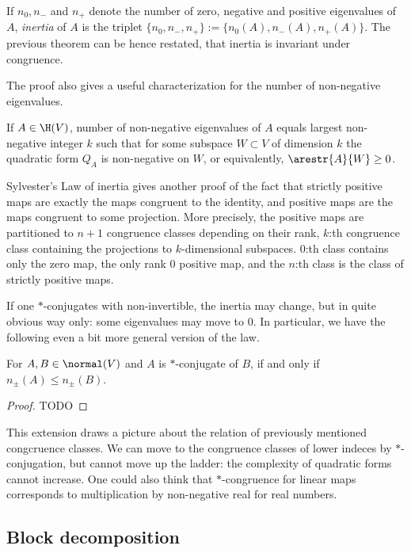 If $n_{0}, n_{-}$ and $n_{+}$ denote the number of zero, negative and positive eigenvalues of $A$, \textit{inertia} of $A$ is the triplet $\{n_{0}, n_{-}, n_{+} \} := \{n_{0}(A), n_{-}(A), n_{+}(A) \}$. The previous theorem can be hence restated, that inertia is invariant under congruence.

The proof also gives a useful characterization for the number of non-negative eigenvalues.

\begin{kor}\label{subspace_lemma}
	If $A \in \H(V)$, number of non-negative eigenvalues of $A$ equals largest non-negative integer $k$ such that for some subspace $W \subset V$ of dimension $k$ the quadratic form $Q_{A}$ is non-negative on $W$, or equivalently, $\arestr{A}{W} \geq 0$.
\end{kor}

Sylvester's Law of inertia gives another proof of the fact that strictly positive maps are exactly the maps congruent to the identity, and positive maps are the maps congruent to some projection. More precisely, the positive maps are partitioned to $n + 1$ congruence classes depending on their rank, $k$:th congruence class containing the projections to $k$-dimensional subspaces. $0$:th class contains only the zero map, the only rank $0$ positive map, and the $n$:th class is the class of strictly positive maps.

If one $*$-conjugates with non-invertible, the inertia may change, but in quite obvious way only: some eigenvalues may move to $0$. In particular, we have the following even a bit more general version of the law.

\begin{lause}
	For $A, B \in \normal(V)$ and $A$ is $*$-conjugate of $B$, if and only if $n_{\pm}(A) \leq n_{\pm}(B)$.
\end{lause}
\begin{proof}
	TODO
\end{proof}

This extension draws a picture about the relation of previously mentioned congcruence classes. We can move to the congruence classes of lower indeces by $*$-conjugation, but cannot move up the ladder: the complexity of quadratic forms cannot increase. One could also think that $*$-congruence for linear maps corresponds to multiplication by non-negative real for real numbers.

\subsection{Block decomposition}

